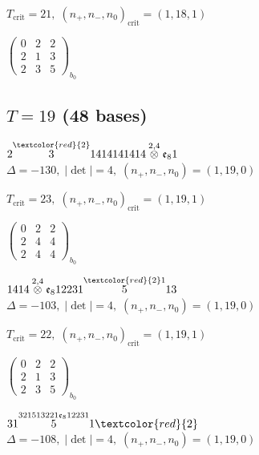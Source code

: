 \documentclass[10pt]{article}
\begin{document}
\hspace{1em}$T_{\text{crit}}=21,\; (n_+,n_-,n_0)_{\text{crit}}=(1,18,1)$

\hspace{2em}$\left(\begin{smallmatrix}0 & 2 & 2 \\ 2 & 1 & 3 \\ 2 & 3 & 5\end{smallmatrix}\right)_{\!b_0}$


\subsection*{$T = 19$ \quad (48 bases)}
\smallskip

$2\overset{\textcolor{red}{2}}{3}1414141414\overset{2,4}{\otimes}\mathfrak{e}_81$ \quad $\Delta=-130,\; |\det|=4,\; (n_+,n_-,n_0)=(1,19,0)$

\hspace{1em}$T_{\text{crit}}=23,\; (n_+,n_-,n_0)_{\text{crit}}=(1,19,1)$

\hspace{2em}$\left(\begin{smallmatrix}0 & 2 & 2 \\ 2 & 4 & 4 \\ 2 & 4 & 4\end{smallmatrix}\right)_{\!b_0}$

\smallskip

$1414\overset{2,4}{\otimes}\mathfrak{e}_812231\overset{\textcolor{red}{2}1}{5}13$ \quad $\Delta=-103,\; |\det|=4,\; (n_+,n_-,n_0)=(1,19,0)$

\hspace{1em}$T_{\text{crit}}=22,\; (n_+,n_-,n_0)_{\text{crit}}=(1,19,1)$

\hspace{2em}$\left(\begin{smallmatrix}0 & 2 & 2 \\ 2 & 1 & 3 \\ 2 & 3 & 5\end{smallmatrix}\right)_{\!b_0}$

\smallskip

$31\overset{321513221\mathfrak{e}_812231}{5}1\textcolor{red}{2}$ \quad $\Delta=-108,\; |\det|=4,\; (n_+,n_-,n_0)=(1,19,0)$
\end{document}
